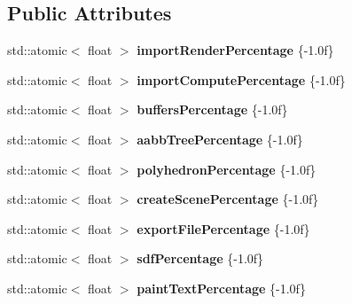 \subsection*{Public Attributes}
\begin{DoxyCompactItemize}
\item 
\mbox{\label{structpepr3d_1_1_geometry_progress_a8c0d575de2c03359bc4e003dda1dcb0d}} 
std\+::atomic$<$ float $>$ {\bfseries import\+Render\+Percentage} \{-\/1.\+0f\}
\item 
\mbox{\label{structpepr3d_1_1_geometry_progress_a65d7951c07a721ef6f5db6df74a15bba}} 
std\+::atomic$<$ float $>$ {\bfseries import\+Compute\+Percentage} \{-\/1.\+0f\}
\item 
\mbox{\label{structpepr3d_1_1_geometry_progress_a6b47ccbd1d8ec7d551579d19a2cf99de}} 
std\+::atomic$<$ float $>$ {\bfseries buffers\+Percentage} \{-\/1.\+0f\}
\item 
\mbox{\label{structpepr3d_1_1_geometry_progress_add7138f9550b00a8c5e67b6b68affc8a}} 
std\+::atomic$<$ float $>$ {\bfseries aabb\+Tree\+Percentage} \{-\/1.\+0f\}
\item 
\mbox{\label{structpepr3d_1_1_geometry_progress_af854f0a26bb66e3ffdb71efae415a5ec}} 
std\+::atomic$<$ float $>$ {\bfseries polyhedron\+Percentage} \{-\/1.\+0f\}
\item 
\mbox{\label{structpepr3d_1_1_geometry_progress_ab9c88b44511633f051fea6616a34e4f5}} 
std\+::atomic$<$ float $>$ {\bfseries create\+Scene\+Percentage} \{-\/1.\+0f\}
\item 
\mbox{\label{structpepr3d_1_1_geometry_progress_af0505fdb14dae3cdadd49ce5aa70516e}} 
std\+::atomic$<$ float $>$ {\bfseries export\+File\+Percentage} \{-\/1.\+0f\}
\item 
\mbox{\label{structpepr3d_1_1_geometry_progress_aa79131603d395402c2073ea89bffd546}} 
std\+::atomic$<$ float $>$ {\bfseries sdf\+Percentage} \{-\/1.\+0f\}
\item 
\mbox{\label{structpepr3d_1_1_geometry_progress_a3cb2fcdd60b9f3a73449d3bd1950f0fc}} 
std\+::atomic$<$ float $>$ {\bfseries paint\+Text\+Percentage} \{-\/1.\+0f\}
\end{DoxyCompactItemize}


